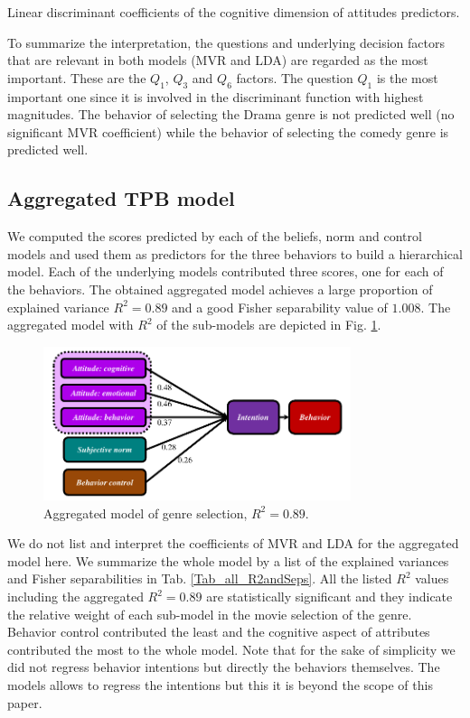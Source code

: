 \begin{table}[!h]
  \centering
   
  \caption{Linear discriminant coefficients of the cognitive dimension of attitudes predictors.}
  \label{Tab_attitudeCog_LDA}
\end{table}

To summarize the interpretation, the questions and underlying decision factors that are relevant in both models (MVR and LDA) are regarded as the most important. These are the $Q_1$, $Q_3$ and $Q_6$ factors. The question $Q_1$ is the most important one since it is involved in the discriminant function with highest magnitudes. The behavior of selecting the Drama genre is not predicted well (no significant MVR coefficient) while the behavior of selecting the comedy genre is predicted well. 

\subsection{Aggregated TPB model}\label{SubSec_AggregateModel}

We computed the scores predicted by each of the beliefs, norm and control models and used them as predictors for the three behaviors to build a hierarchical model. Each of the underlying models contributed three scores, one for each of the behaviors. The obtained aggregated model achieves a large proportion of explained variance $R^2=0.89$ and a good Fisher separability value of $1.008$. The aggregated model with $R^2$ of the sub-models are depicted in Fig. \ref{Fig_AggregModel}. 

 \begin{figure}[h!]
 \begin{center}
   \includegraphics[width=9cm]{TpbTopH.pdf}
   \caption[Fig_AggregModel]{Aggregated  model of genre selection, $R^2=0.89$.}
   \label{Fig_AggregModel}
 \end{center}
 \end{figure}


We do not list and interpret the coefficients of MVR and LDA for the aggregated model here. We summarize the whole model by a list of the explained variances and Fisher separabilities in Tab. \ref{Tab_all_R2andSeps}. All the listed $R^2$ values including the aggregated $R^2=0.89$ are statistically significant and they indicate the relative weight of each sub-model in the movie selection of the genre. Behavior control contributed the least and the cognitive aspect of attributes contributed the most to the whole model. Note that for the sake of simplicity we did not regress behavior intentions but directly the behaviors themselves. The models allows to regress the intentions but this it is beyond the scope of this paper. 

